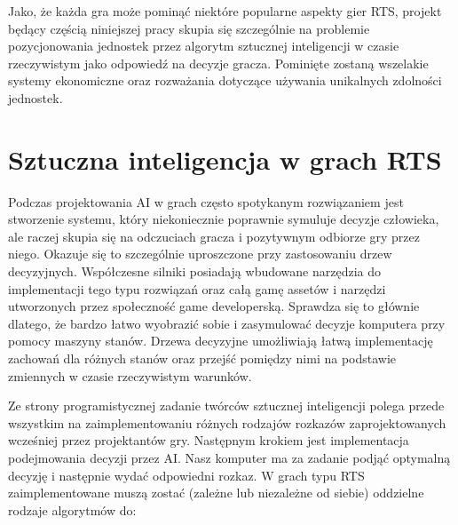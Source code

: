\documentclass[12pt]{report}
\begin{document}
Jako, że każda gra może pominąć niektóre popularne aspekty gier RTS, projekt będący częścią niniejszej pracy skupia się szczególnie na problemie pozycjonowania jednostek przez algorytm sztucznej inteligencji w czasie rzeczywistym jako odpowiedź na decyzje gracza. Pominięte zostaną wszelakie systemy ekonomiczne oraz rozważania dotyczące używania unikalnych zdolności jednostek.
\section {Sztuczna inteligencja w grach RTS}
Podczas projektowania AI w grach często spotykanym rozwiązaniem jest stworzenie systemu, który niekoniecznie poprawnie symuluje decyzje człowieka, ale raczej skupia się na odczuciach gracza i pozytywnym odbiorze gry przez niego. Okazuje się to szczególnie uproszczone przy zastosowaniu drzew decyzyjnych. Współczesne silniki posiadają wbudowane narzędzia do implementacji tego typu rozwiązań oraz całą gamę assetów i narzędzi utworzonych przez społeczność game developerską. Sprawdza się to głównie dlatego, że bardzo łatwo wyobrazić sobie i zasymulować decyzje komputera przy pomocy maszyny stanów. Drzewa decyzyjne umożliwiają łatwą implementację zachowań dla różnych stanów oraz przejść pomiędzy nimi na podstawie zmiennych w czasie rzeczywistym warunków.

Ze strony programistycznej zadanie twórców sztucznej inteligencji polega przede wszystkim na zaimplementowaniu różnych rodzajów rozkazów zaprojektowanych wcześniej przez projektantów gry. Następnym krokiem jest implementacja podejmowania decyzji przez AI. Nasz komputer ma za zadanie podjąć optymalną decyzję i następnie wydać odpowiedni rozkaz. W grach typu RTS zaimplementowane muszą zostać (zależne lub niezależne od siebie) oddzielne rodzaje algorytmów do: 
\end{document}
